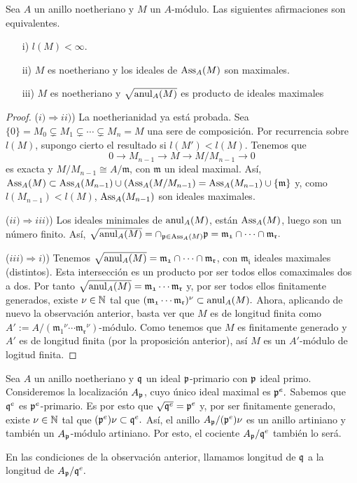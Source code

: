 \documentclass[../main.tex]{subfiles}
\begin{document}
\begin{proposition}Sea $A$ un anillo noetheriano y $M$ un $A$-módulo. Las siguientes afirmaciones son equivalentes.
\begin{itemize}
    \item[i)] $l(M)<\infty$.
    \item[ii)] $M$ es noetheriano y los ideales de $\text{Ass}_A(M)$ son maximales.
    \item[iii)] $M$ es noetheriano y $\sqrt{\operatorname{anul}_A(M)}$ es producto de ideales maximales
\end{itemize}
\end{proposition}
\begin{proof}
($i)\Rightarrow ii)$) La noetherianidad ya está probada. Sea $\{0\}=M_0\subsetneq M_1\subsetneq\cdots\subsetneq M_n=M$ una sere de composición. Por recurrencia sobre $l(M)$, supongo cierto el resultado si $l(M')<l(M).$ Tenemos que
$$0\rightarrow M_{n-1}\rightarrow M\rightarrow M/M_{n-1}\rightarrow 0$$
es exacta y $M/M_{n-1}\cong A/\mathfrak{m}$, con $\mathfrak{m}$ un ideal maximal. Así, $\text{Ass}_A(M)\subset \text{Ass}_A(M_{n-1})\cup(\text{Ass}_A(M/M_{n-1})=\text{Ass}_A(M_{n-1})\cup\{\mathfrak{m}\}$ y, como $l(M_{n-1})<l(M)$, $\text{Ass}_A(M_{n-1})$ son ideales maximales.

($ii)\Rightarrow iii)$) Los ideales minimales de $\operatorname{anul}_A(M)$, están $\text{Ass}_A(M)$, luego son un número finito. Así, $\sqrt{\operatorname{anul}_A(M)}=\cap_{\mathfrak{p}\in\text{Ass}_A(M)}\mathfrak{p}=\mathfrak{m_1}\cap\cdots\cap\mathfrak{m_r}.$

($iii)\Rightarrow i)$) Tenemos $\sqrt{\operatorname{anul}_A(M)}=\mathfrak{m_1}\cap\cdots\cap\mathfrak{m_r}$, con $\mathfrak{m_i}$ ideales maximales (distintos). Esta intersección es un producto por ser todos ellos comaximales dos a dos. Por tanto $\sqrt{\operatorname{anul}_A(M)}=\mathfrak{m_1}\cdots\mathfrak{m_r}$ y, por ser todos ellos finitamente generados, existe $\nu\in\mathbb{N}$ tal que $(\mathfrak{m_1}\cdots\mathfrak{m_r})^\nu\subset\operatorname{anul}_A(M).$ Ahora, aplicando de nuevo la observación anterior, basta ver que $M$ es de longitud finita como $A':=A/(\mathfrak{m_1}^\nu\cdots\mathfrak{m_r}^\nu)$-módulo. Como tenemos que $M$ es finitamente generado y $A'$ es de longitud finita (por la proposición anterior), así $M$ es un $A'$-módulo de logitud finita.
\end{proof}

\begin{remark}
Sea $A$ un anillo noetheriano y $\mathfrak{q}$ un ideal $\mathfrak{p}$-primario con $\mathfrak{p}$ ideal primo. Consideremos la localización $A_{\mathfrak{p}}$, cuyo único ideal maximal es $\mathfrak{p}^e.$ Sabemos que $\mathfrak{q}^e$ es $\mathfrak{p}^e$-primario. Es por esto que $\sqrt{\mathfrak{q}^e}=\mathfrak{p}^e$ y, por ser finitamente generado, existe $\nu\in\mathbb{N}$ tal que $(\mathfrak{p}^e)\nu\subset \mathfrak{q}^e.$ Así, el anillo $A_{\mathfrak{p}}/(\mathfrak{p}^e)\nu$ es un anillo artiniano y también un $A_{\mathfrak{p}}$-módulo artiniano. Por esto, el cociente $A_{\mathfrak{p}}/\mathfrak{q}^e$ también lo será.
\end{remark}

\begin{definition}
En las condiciones de la observación anterior, llamamos longitud de $\mathfrak{q}$ a la longitud de $A_{\mathfrak{p}}/\mathfrak{q}^e.$
\end{definition}
\end{document}
